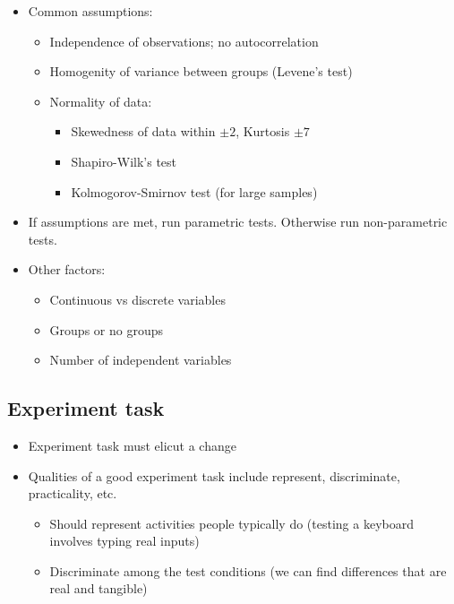 \documentclass[12pt]{book}
\begin{document}
\begin{itemize}
  \item Common assumptions:
  \begin{itemize}
    \item Independence of observations; no autocorrelation
    \item Homogenity of variance between groups (Levene's test)
    \item Normality of data:
    \begin{itemize}
      \item Skewedness of data within $\pm 2$, Kurtosis $\pm 7$
      \item Shapiro-Wilk's test
      \item Kolmogorov-Smirnov test (for large samples)
    \end{itemize} 
  \end{itemize} 
  \item If assumptions are met, run parametric tests. Otherwise run non-parametric tests.
  \item Other factors:
  \begin{itemize}
    \item Continuous vs discrete variables
    \item Groups or no groups
    \item Number of independent variables
  \end{itemize}
\end{itemize}

\subsection*{Experiment task}
\begin{itemize}
  \item Experiment task must elicut a change
  \item Qualities of a good experiment task include represent, discriminate, practicality, etc.
  \begin{itemize}
    \item Should represent activities people typically do (testing a keyboard involves typing real inputs)
    \item Discriminate among the test conditions (we can find differences that are real and tangible)
  \end{itemize}
\end{itemize}
\end{document}
